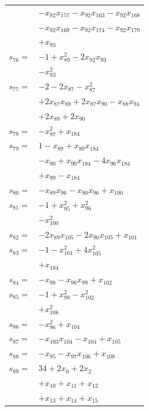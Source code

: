 \begin{longtable}{@{}r@{\;}l@{}}
 & \(\displaystyle -x_{92}x_{157} -x_{92}x_{163} -x_{92}x_{168}\) \\
 & \(\displaystyle -x_{92}x_{169} -x_{92}x_{174} -x_{92}x_{179}\) \\
 & \(\displaystyle +x_{93}\) \\[3pt]
\(s_{76}=\) & \(\displaystyle -1 +x_{89}^{2} -2x_{92}x_{93}\) \\
 & \(\displaystyle -x_{93}^{2}\) \\[3pt]
\(s_{77}=\) & \(\displaystyle -2 -2x_{87} -x_{87}^{2}\) \\
 & \(\displaystyle +2x_{87}x_{89} +2x_{87}x_{90} -x_{88}x_{94}\) \\
 & \(\displaystyle +2x_{89} +2x_{90}\) \\[3pt]
\(s_{78}=\) & \(\displaystyle -x_{97}^{2} +x_{184}\) \\[3pt]
\(s_{79}=\) & \(\displaystyle 1 -x_{89} +x_{89}x_{184}\) \\
 & \(\displaystyle -x_{90} +x_{90}x_{184} -4x_{96}x_{184}\) \\
 & \(\displaystyle +x_{99} -x_{184}\) \\[3pt]
\(s_{80}=\) & \(\displaystyle -x_{89}x_{96} -x_{90}x_{96} +x_{100}\) \\[3pt]
\(s_{81}=\) & \(\displaystyle -1 +x_{95}^{2} +x_{96}^{2}\) \\
 & \(\displaystyle -x_{100}^{2}\) \\[3pt]
\(s_{82}=\) & \(\displaystyle -2x_{89}x_{105} -2x_{90}x_{105} +x_{101}\) \\[3pt]
\(s_{83}=\) & \(\displaystyle -1 -x_{101}^{2} +4x_{105}^{2}\) \\
 & \(\displaystyle +x_{184}\) \\[3pt]
\(s_{84}=\) & \(\displaystyle -x_{98} -x_{98}x_{99} +x_{102}\) \\[3pt]
\(s_{85}=\) & \(\displaystyle -1 +x_{98}^{2} -x_{102}^{2}\) \\
 & \(\displaystyle +x_{108}^{2}\) \\[3pt]
\(s_{86}=\) & \(\displaystyle -x_{96}^{2} +x_{104}\) \\[3pt]
\(s_{87}=\) & \(\displaystyle -x_{103}x_{104} -x_{104} +x_{105}\) \\[3pt]
\(s_{88}=\) & \(\displaystyle -x_{95} -x_{97}x_{106} +x_{108}\) \\[3pt]
\(s_{89}=\) & \(\displaystyle 34 +2x_{0} +2x_{2}\) \\
 & \(\displaystyle +x_{10} +x_{11} +x_{12}\) \\
 & \(\displaystyle +x_{13} +x_{14} +x_{15}\) \\

\end{longtable}
